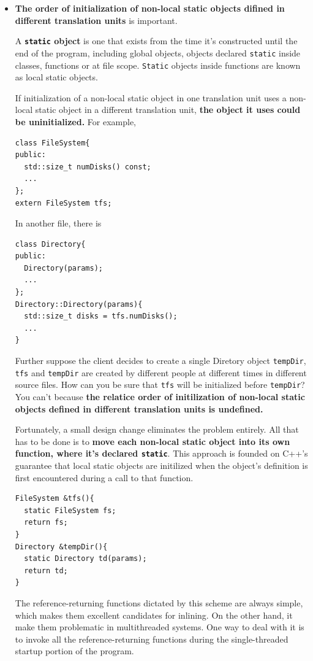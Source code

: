\documentclass[a4paper,twoside]{article}
\theoremstyle{definition}
\theoremstyle{remark}
\numberwithin{equation}{section}
\let\OldTexttt\texttt
\renewcommand{\texttt}[1]{{\color{blue} \OldTexttt{#1}}}
\begin{document}
\begin{itemize}
\item \textbf{The order of initialization of non-local static objects difined
    in different translation units} is important.

  A \textbf{\texttt{static} object} is one that exists from the time it's
  constructed until the end of the program, including global objects,
  objects declared \texttt{static} inside classes, functions or at
  file scope. \texttt{Static} objects inside functions are known as
  local static objects.

  If initialization of a non-local static object in one translation
  unit uses a non-local static object in a different translation unit,
  \textbf{the object it uses could be uninitialized.} For example, 
\begin{verbatim}
class FileSystem{
public:
  std::size_t numDisks() const;
  ...
};
extern FileSystem tfs;
\end{verbatim}
  In another file, there is
\begin{verbatim}
class Directory{
public:
  Directory(params);
  ...
};
Directory::Directory(params){ 
  std::size_t disks = tfs.numDisks(); 
  ...
}
\end{verbatim}
Further suppose the client decides to create a single Diretory object \texttt{tempDir},
\texttt{tfs} and \texttt{tempDir} are created by different people at
different times in different source files. How can you be sure that
\texttt{tfs} will be initialized before \texttt{tempDir}? You can't
because \textbf{the relatice order of initilization of non-local
  static objects defined in different translation units is undefined.}

Fortunately, a small design change eliminates the problem
entirely. All that has to be done is to \textbf{move each non-local
  static object into its own function, where it's declared
  \texttt{static}}. This approach is founded on C++'s guarantee that local
static objects are initilized when the object's definition is first
encountered during a call to that function.
\begin{verbatim}
FileSystem &tfs(){
  static FileSystem fs;
  return fs;
}
Directory &tempDir(){
  static Directory td(params);
  return td;
}
\end{verbatim}
The reference-returning functions dictated by this scheme are always
simple, which makes them excellent candidates for inlining. On the
other hand, it make them problematic in multithreaded systems. One way
to deal with it is to invoke all the reference-returning functions
during the single-threaded startup portion of the program.
\end{itemize}
\end{document}
